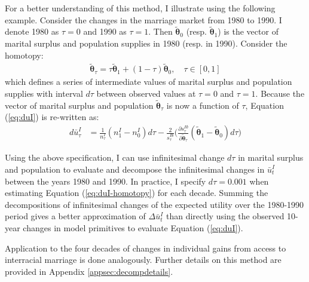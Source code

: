 For a better understanding of this method, I illustrate using the following example. Consider the changes in the marriage market from 1980 to 1990. I denote 1980 as $\tau = 0$ and 1990 as $\tau = 1$. Then $\tilde{\boldsymbol{\theta}}_0$ (resp. $\tilde{\boldsymbol{\theta}}_1$)  is the vector of marital surplus and population supplies in 1980 (resp. in 1990). Consider the homotopy:
\begin{align*}
	\tilde{\boldsymbol{\theta}}_\tau = \tau \tilde{\boldsymbol{\theta}}_1 + (1-\tau) \tilde{\boldsymbol{\theta}}_0, \quad \tau \in [0,1]
\end{align*}
which defines a series of intermediate values of marital surplus and population supplies with interval $d\tau$ between observed values at $\tau = 0$ and $\tau = 1$. Because  the vector of marital surplus and population $\tilde{\boldsymbol{\theta}}_\tau$ is now a function of $\tau$, Equation (\ref{eq:duI}) is re-written as:
\begin{align}
	d\bar{u}^I_{\tau} &= \frac{1}{n^I_\tau}(n^I_1 - n^I_0)d\tau -  \frac{2}{s^{I\emptyset}_{\tau}} \Big(  \frac{\partial s^{I\emptyset}_{\tau} }{\partial \tilde{\boldsymbol{\theta}}_\tau}  (\tilde{\boldsymbol{\theta}}_1 - \tilde{\boldsymbol{\theta}}_0)d\tau  \Big) \label{eq:duI-homotopy}
\end{align}

Using the above specification, I can use infinitesimal change $d\tau$ in marital surplus and population to evaluate and decompose the infinitesimal changes in $\bar{u}^I_t$ between the years 1980 and 1990.  In practice, I specify $d\tau = 0.001$ when estimating Equation (\ref{eq:duI-homotopy}) for each decade. Summing the decompositions of infinitesimal changes of the expected utility over the 1980-1990 period gives a better approximation of $\Delta \bar{u}^I_t$ than directly using the observed 10-year changes in model primitives to evaluate Equation (\ref{eq:duI}). 

Application to the four decades of changes in individual gains from access to interracial marriage is done analogously. Further details on this method are provided in Appendix \ref{appsec:decompdetails}. 


